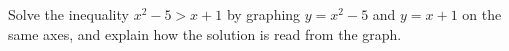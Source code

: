 Solve the inequality $x^2-5>x+1$ by graphing $y=x^2-5$ and $y=x+1$ on the same axes, and explain how the solution is read from the graph.
